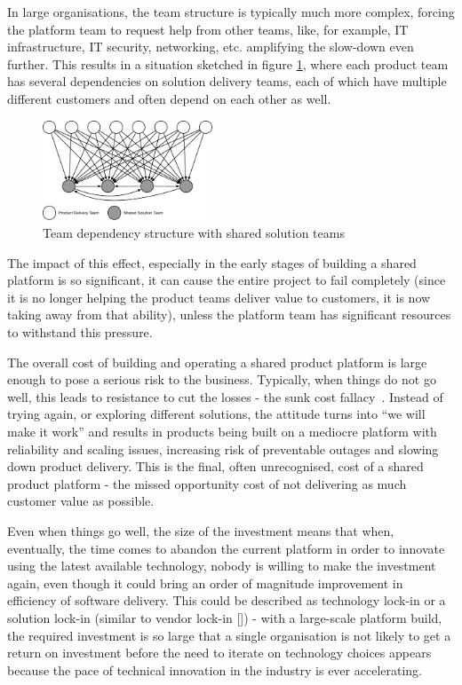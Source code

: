 \documentclass[reprint,amsmath,amssymb,aps]{revtex4-1}
\begin{document}
In large organisations, the team structure is typically much more complex, forcing the platform team to request help from other teams, like, for example, IT infrastructure, IT security, networking, etc. amplifying the slow-down even further. This results in a situation sketched in figure \ref{fig:dependencies}, where each product team has several dependencies on solution delivery teams, each of which have multiple different customers and often depend on each other as well.


\begin{figure}[h]
	\includegraphics[width=0.45\textwidth]{figs/dependencies}
	\caption{Team dependency structure with shared solution teams}
	\label{fig:dependencies}
\end{figure}

The impact of this effect, especially in the early stages of building a shared platform is so significant, it can cause the entire project to fail completely (since it is no longer helping the product teams deliver value to customers, it is now taking away from that ability), unless the platform team has significant resources to withstand this pressure.

The overall cost of building and operating a shared product platform is large enough to pose a serious risk to the business. Typically, when things do not go well, this leads to resistance to cut the losses - the sunk cost fallacy~\cite{TheSunkC23:online}. Instead of trying again, or exploring different solutions, the attitude turns into ``we will make it work'' and results in products being built on a mediocre platform with reliability and scaling issues, increasing risk of preventable outages and slowing down product delivery. This is the final, often unrecognised, cost of a shared product platform - the missed opportunity cost of not delivering as much customer value as possible.

Even when things go well, the size of the investment means that when, eventually, the time comes to abandon the current platform in order to innovate using the latest available technology, nobody is willing to make the investment again, even though it could bring an order of magnitude improvement in efficiency of software delivery. This could be described as technology lock-in or a solution lock-in (similar to vendor lock-in []) - with a large-scale platform build, the required investment is so large that a single organisation is not likely to get a return on investment before the need to iterate on technology choices appears because the pace of technical innovation in the industry is ever accelerating.
\end{document}
